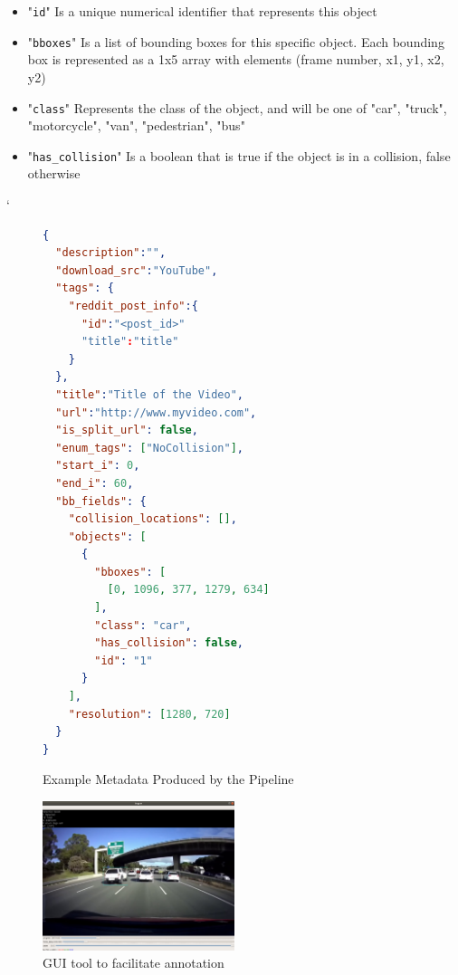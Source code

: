 \documentclass[letterpaper, 10 pt, conference]{IEEEconf}
\begin{document}
\begin{itemize}
\begin{itemize}
\begin{itemize}
      \item "\texttt{id}" Is a  unique numerical identifier that represents this object
      \item "\texttt{bboxes}" Is a list of bounding boxes for this specific object. Each bounding box is represented as a 1x5 array with elements (frame number, x1, y1, x2, y2)
      \item "\texttt{class}" Represents the class of the object, and will be one of "car", "truck", "motorcycle", "van", "pedestrian", "bus"
      \item "\texttt{has\_collision}" Is a boolean that is true if the object is in a collision, false otherwise
    \end{itemize}
  \end{itemize}
\end{itemize}`

\begin{figure}
  \begin{lstlisting}[language=json]
{
  "description":"",
  "download_src":"YouTube",
  "tags": {
    "reddit_post_info":{
      "id":"<post_id>"
      "title":"title"
    }
  },
  "title":"Title of the Video",
  "url":"http://www.myvideo.com",
  "is_split_url": false,
  "enum_tags": ["NoCollision"],
  "start_i": 0,
  "end_i": 60,
  "bb_fields": {
    "collision_locations": [],
    "objects": [
      {
        "bboxes": [
          [0, 1096, 377, 1279, 634]
        ],
        "class": "car",
        "has_collision": false,
        "id": "1"
      }
    ],
    "resolution": [1280, 720]
  }
}
  \end{lstlisting}
    \caption{Example Metadata Produced by the Pipeline}
    \label{metadata_example}
\end{figure}

\begin{figure}[htpb]
		\centering
    \includegraphics[width=0.5\textwidth]{example_gui_tool.png}
		\caption{GUI tool to facilitate annotation}
		\label{fig:example_gui_tool-png}
\end{figure}
\end{document}
